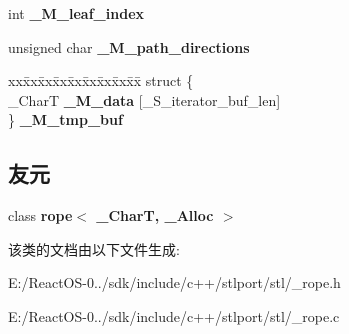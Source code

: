 \begin{DoxyCompactItemize}
\begin{tabbing}
\end{tabbing}\item 
\mbox{\label{class___rope__iterator__base_a9ba358010efedfa7f04d9a2fcc6b7c91}} 
int {\bfseries \+\_\+\+M\+\_\+leaf\+\_\+index}
\item 
\mbox{\label{class___rope__iterator__base_a3936f27d67d50f06faf17f633c3d5609}} 
unsigned char {\bfseries \+\_\+\+M\+\_\+path\+\_\+directions}
\item 
\mbox{\label{class___rope__iterator__base_aae9819f84f00eda250a4993de774515c}} 
\begin{tabbing}
xx\=xx\=xx\=xx\=xx\=xx\=xx\=xx\=xx\=\kill
struct \{\\
\>\_CharT {\bfseries \_M\_data} \mbox{[}\_S\_iterator\_buf\_len\mbox{]}\\
\} {\bfseries \_M\_tmp\_buf}\\

\end{tabbing}\end{DoxyCompactItemize}
\subsection*{友元}
\begin{DoxyCompactItemize}
\item 
\mbox{\label{class___rope__iterator__base_a00faa722d619490e42c85e81ecdeba5e}} 
class {\bfseries rope$<$ \+\_\+\+Char\+T, \+\_\+\+Alloc $>$}
\end{DoxyCompactItemize}


该类的文档由以下文件生成\+:\begin{DoxyCompactItemize}
\item 
E\+:/\+React\+O\+S-\/0../sdk/include/c++/stlport/stl/\+\_\+rope.\+h\item 
E\+:/\+React\+O\+S-\/0../sdk/include/c++/stlport/stl/\+\_\+rope.\+c\end{DoxyCompactItemize}
